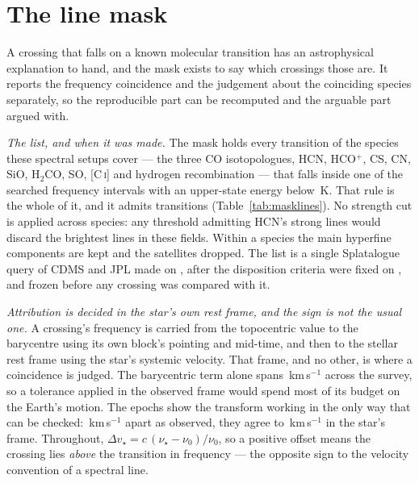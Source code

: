 \section{The line mask}
\label{app:linemask}

A crossing that falls on a known molecular transition has an astrophysical
explanation to hand, and the mask exists to say which crossings those are. It
reports the frequency coincidence and the judgement about the coinciding
species separately, so the reproducible part can be recomputed and the
arguable part argued with.

\emph{The list, and when it was made.} The mask holds every transition of the
\FrNSpec{} species these spectral setups cover --- the three CO isotopologues,
HCN, HCO$^{+}$, CS, CN, SiO, H$_2$CO, SO, [C\,\textsc{i}] and hydrogen
recombination --- that falls inside one of the \McNIsland{} searched frequency
intervals with an upper-state energy below \McEuMax\,K. That rule is the whole
of it, and it admits \FrNTrans{} transitions (Table~\ref{tab:masklines}).
No strength cut is applied across species: any threshold admitting HCN's
strong lines would discard the brightest lines in these fields. Within a
species the main hyperfine components are kept and the satellites
dropped. The list is a single Splatalogue query of CDMS and
JPL \citep{Pickett1998,CDMS2005} made on \MkListDate{}, after the disposition
criteria were fixed on \MkCritDate, and frozen before any crossing was
compared with it.

\emph{Attribution is decided in the star's own rest frame, and the sign is
not the usual one.} A crossing's frequency is carried from the topocentric
value to the barycentre using its own block's pointing and mid-time, and then
to the stellar rest frame using the star's systemic velocity. That frame, and
no other, is where a coincidence is judged.
The barycentric term alone spans \FrBarySwing\,km\,s$^{-1}$ across the
survey, so a tolerance applied in the observed frame would spend most of its
budget on the Earth's motion. The \FrEpochNEpoch{} \FrEpochStar{} epochs show
the transform working in the only way that can be checked:
\FrEpochTopoKms\,km\,s$^{-1}$ apart as observed, they agree to
\FrEpochStelKms\,km\,s$^{-1}$ in the star's frame.
Throughout, $\Delta v_\star = c\,(\nu_\star-\nu_0)/\nu_0$, so a positive
offset means the crossing lies \emph{above} the transition in frequency ---
the opposite sign to the velocity convention of a spectral line.

